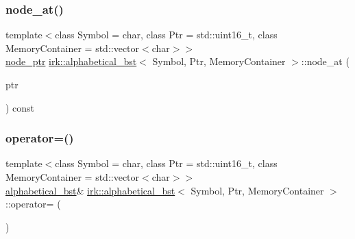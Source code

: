 \mbox{\label{classirk_1_1alphabetical__bst_a6330f671acd304c9ca37c3ac6aff3655}} 
\subsubsection{\texorpdfstring{node\+\_\+at()}{node\_at()}}
{\footnotesize\ttfamily template$<$class Symbol = char, class Ptr = std\+::uint16\+\_\+t, class Memory\+Container = std\+::vector$<$char$>$$>$ \\
\mbox{\hyperlink{structirk_1_1alphabetical__bst_1_1node__ptr}{node\+\_\+ptr}} \mbox{\hyperlink{classirk_1_1alphabetical__bst}{irk\+::alphabetical\+\_\+bst}}$<$ Symbol, Ptr, Memory\+Container $>$\+::node\+\_\+at (\begin{DoxyParamCaption}\item[{\mbox{\hyperlink{classirk_1_1alphabetical__bst_ae689c05ab96a71769e24908d5c73765c}{pointer\+\_\+type}}}]{ptr }\end{DoxyParamCaption}) const\hspace{0.3cm}{\ttfamily [inline]}}

\mbox{\label{classirk_1_1alphabetical__bst_ab78a09e29fa6027fe10f1909477288c2}} 
\subsubsection{\texorpdfstring{operator=()}{operator=()}\hspace{0.1cm}{\footnotesize\ttfamily [1/2]}}
{\footnotesize\ttfamily template$<$class Symbol = char, class Ptr = std\+::uint16\+\_\+t, class Memory\+Container = std\+::vector$<$char$>$$>$ \\
\mbox{\hyperlink{classirk_1_1alphabetical__bst}{alphabetical\+\_\+bst}}\& \mbox{\hyperlink{classirk_1_1alphabetical__bst}{irk\+::alphabetical\+\_\+bst}}$<$ Symbol, Ptr, Memory\+Container $>$\+::operator= (\begin{DoxyParamCaption}\item[{const \mbox{\hyperlink{classirk_1_1alphabetical__bst}{alphabetical\+\_\+bst}}$<$ Symbol, Ptr, Memory\+Container $>$ \&}]{ }\end{DoxyParamCaption})\hspace{0.3cm}{\ttfamily [default]}}

